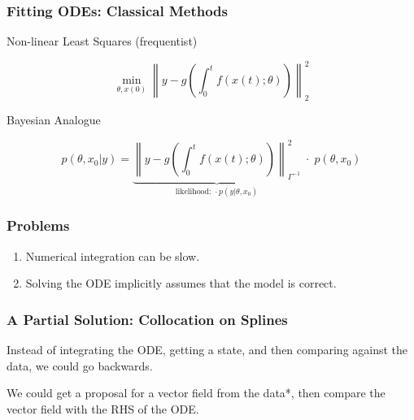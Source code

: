\documentclass[aspectratio=169]{beamer}
\newcommand{\norm}[2][2]{\left\lVert #2 \right\rVert_{#1}}
\begin{document}
\begin{frame}[t]
  \frametitle{Fitting ODEs: Classical Methods}
  Non-linear Least Squares (frequentist)

  \begin{equation*}
    \min_{\theta, x(0)}  \left\lVert y - g\left(\int_0^{t} f(x(t);\theta)\right)  \right\rVert^2_2
  \end{equation*}
  \pause

  Bayesian Analogue

  \begin{equation*}
    p(\theta, x_0 | y) = \underbrace{\left\lVert y - g\left(\int_0^{t} f(x(t);\theta)\right) \right\rVert^2_{\Gamma^{-1}}}_{\text{likelihood: } \cdot p(y|\theta, x_0)} \;\cdot \;p(\theta, x_0)
  \end{equation*}

\end{frame}

\begin{frame}
  \frametitle{Problems}

  \begin{enumerate}
    \setlength{\itemsep}{1ex}
    \item Numerical integration can be slow.
    \item Solving the ODE implicitly assumes that the model is correct.
  \end{enumerate}
\end{frame}

\begin{frame}
  \frametitle{A Partial Solution: Collocation on Splines}

  Instead of integrating the ODE, getting a state, and then comparing against the data, we could go backwards.
  
  We could get a proposal for a vector field from the data*, then compare the vector field with the RHS of the ODE.


\end{frame}

  


\end{document}
